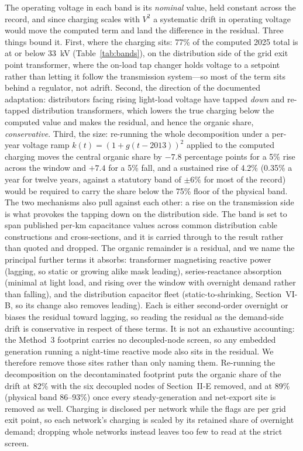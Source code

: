 \documentclass[journal]{IEEEtran}
\begin{document}
The operating voltage in each band is its \emph{nominal} value, held constant
across the record, and since charging scales with $V^2$ a systematic drift in
operating voltage would move the computed term and land the difference in the
residual. Three things bound it. First, where the charging sits: 77\% of the
computed 2025 total is at or below 33~kV (Table~\ref{tab:bands}), on the
distribution side of the grid exit point transformer, where the on-load tap
changer holds voltage to a setpoint rather than letting it follow the transmission
system---so most of the term sits behind a regulator, not adrift. Second, the
direction of the documented adaptation: distributors facing rising light-load
voltage have tapped \emph{down} and re-tapped distribution transformers, which
lowers the true charging below the computed value and makes the residual, and
hence the organic share, \emph{conservative}. Third, the size: re-running the
whole decomposition under a per-year voltage ramp $k(t)=(1+g(t-2013))^2$ applied
to the computed charging moves the central organic share by $-7.8$ percentage
points for a 5\% rise across the window and $+7.4$ for a 5\% fall, and a sustained
rise of 4.2\% (0.35\% a year for twelve years, against a statutory band of
$\pm 6\%$ for most of the record) would be required to carry the share below the
75\% floor of the physical band. The two mechanisms also pull against each other:
a rise on the transmission side is what provokes the tapping down on the
distribution side. The band is set to span published per-km capacitance
values across common distribution cable constructions and cross-sections, and it is
carried through to the result rather than quoted and dropped. The organic remainder is a residual, and we name the principal further terms
it absorbs: transformer magnetising reactive power (lagging, so static or growing
alike mask leading), series-reactance absorption (minimal at light load, and
rising over the window with overnight demand rather than falling), and the
distribution capacitor fleet (static-to-shrinking, Section~VI-B, so its change
also removes leading). Each is either second-order overnight or biases the
residual toward lagging, so reading the residual as the demand-side drift is
conservative in respect of these terms. It is not an exhaustive accounting: the Method~3 footprint carries no
decoupled-node screen, so any embedded generation running a night-time reactive
mode also sits in the residual. We therefore remove those sites rather than only
naming them. Re-running the decomposition on the decontaminated footprint puts the
organic share of the drift at 82\% with the six decoupled nodes of Section~II-E
removed, and at 89\% (physical band 86--93\%) once every steady-generation and
net-export site is removed as well. Charging is disclosed per network while the
flags are per grid exit point, so each network's charging is scaled by its
retained share of overnight demand; dropping whole networks instead leaves too
few to read at the strict screen.
\end{document}
